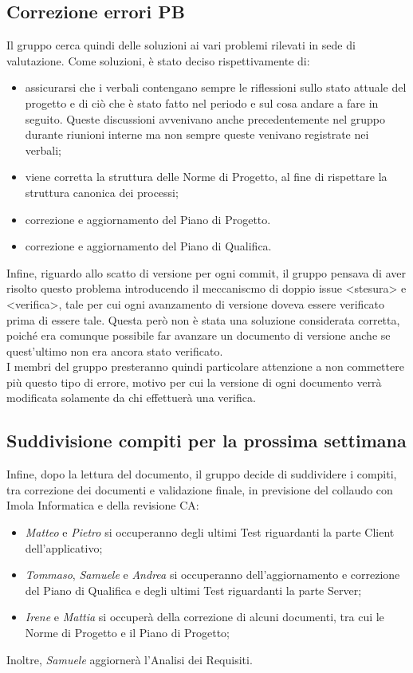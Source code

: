 \subsection{Correzione errori PB}
Il gruppo cerca quindi delle soluzioni ai vari problemi rilevati in sede di valutazione. Come soluzioni, è stato deciso rispettivamente di:
\begin{itemize}
  \item assicurarsi che i verbali contengano sempre le riflessioni sullo stato attuale del progetto e di ciò che è stato fatto nel periodo e sul cosa andare a fare in seguito. 
  Queste discussioni avvenivano anche precedentemente nel gruppo durante riunioni interne ma non sempre queste venivano registrate nei verbali;
  \item viene corretta la struttura delle Norme di Progetto, al fine di rispettare la struttura canonica dei processi;
  \item correzione e aggiornamento del Piano di Progetto.
  \item correzione e aggiornamento del Piano di Qualifica.
\end{itemize}
Infine, riguardo allo scatto di versione per ogni commit, il gruppo pensava di aver risolto questo problema introducendo il meccaniscmo di doppio issue <stesura> e <verifica>, tale per cui ogni
avanzamento di versione doveva essere verificato prima di essere tale. Questa però non è stata una soluzione considerata corretta, poiché era comunque possibile far avanzare un documento di versione anche se 
quest'ultimo non era ancora stato verificato. \\
I membri del gruppo presteranno quindi particolare attenzione a non commettere più questo tipo di errore, motivo per cui la versione di ogni documento verrà modificata solamente da chi effettuerà una verifica. 


\subsection{Suddivisione compiti per la prossima settimana}
Infine, dopo la lettura del documento, il gruppo decide di suddividere i compiti, tra correzione dei documenti e validazione finale, in previsione del collaudo con Imola Informatica e della revisione CA:
\begin{itemize}
  \item \textit{Matteo} e \textit{Pietro} si occuperanno degli ultimi Test riguardanti la parte Client \\ dell'applicativo;
  \item \textit{Tommaso}, \textit{Samuele} e \textit{Andrea} si occuperanno dell'aggiornamento e correzione del Piano di Qualifica e degli ultimi Test riguardanti la parte Server;
  \item \textit{Irene} e \textit{Mattia} si occuperà della correzione di alcuni documenti, tra cui le Norme di Progetto e il Piano di Progetto;
\end{itemize}
Inoltre, \textit{Samuele} aggiornerà l'Analisi dei Requisiti.
